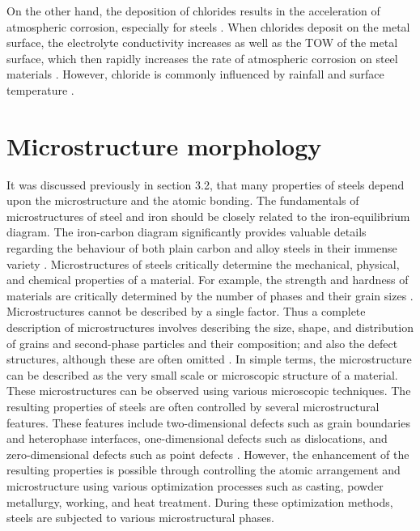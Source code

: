 On the other hand, the deposition of chlorides results in the acceleration of atmospheric corrosion, especially for steels \cite{islam2018effects}. When chlorides deposit on the metal surface, the electrolyte conductivity increases as well as the TOW of the metal surface, which then rapidly increases the rate of atmospheric corrosion on steel materials \cite{marzorati2018green}. However, chloride is commonly influenced by rainfall and surface temperature \cite{cai2018influence}.

\section{Microstructure morphology} 
It was discussed previously in section 3.2, that many properties of steels depend upon the microstructure and the atomic bonding. The fundamentals of microstructures of steel and iron should be closely related to the iron-equilibrium diagram. The iron-carbon diagram significantly provides valuable details regarding the behaviour of both plain carbon and alloy steels in their immense variety \cite{bhadeshia2017steels}. 
Microstructures of steels critically determine the mechanical, physical, and chemical properties of a material. For example, the strength and hardness of materials are critically determined by the number of phases and their grain sizes \cite{clemens2017microstructure}. Microstructures cannot be described by a single factor. Thus a complete description of microstructures involves describing the size, shape, and distribution of grains and second-phase particles and their composition; and also the defect structures, although these are often omitted \cite{suryanarayana2017microstructure}. In simple terms, the microstructure can be described as the very small scale or microscopic structure of a material. These microstructures can be observed using various microscopic techniques.  
The resulting properties of steels are often controlled by several microstructural features. These features include two-dimensional defects such as grain boundaries and heterophase interfaces, one-dimensional defects such as dislocations, and zero-dimensional defects such as point defects \cite{clemens2017microstructure}. However, the enhancement of the resulting properties is possible through controlling the atomic arrangement and microstructure using various optimization processes such as casting, powder metallurgy, working, and heat treatment. During these optimization methods, steels are subjected to various microstructural phases.

